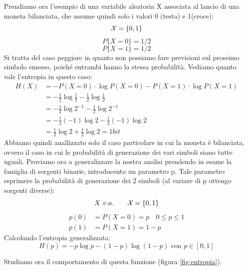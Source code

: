 Prendiamo ora l'esempio di una variabile aleatoria X associata al lancio di una moneta bilanciata, che assume quindi solo i valori 0 (testa) e 1(croce):
\[\mathcal{X} = \{0,1\}\]
\[P\{X = 0\} = 1/2\]
\[P\{X = 1\} = 1/2\]
Si tratta del caso peggiore in quanto non possiamo fare previsioni sul prossimo simbolo emesso, poiché entrambi hanno la stessa probabilità. Vediamo quanto vale l'entropia in questo caso:
\[
\begin{split} 
H(X) &= - P(X = 0) \cdot \log P(X = 0) - P(X = 1) \cdot \log P(X = 1)\\ 
&= -\frac{1}{2} \log{\frac{1}{2}} -\frac{1}{2} \log{\frac{1}{2}}\\ 
&= - \frac{1}{2} \log{2^{-1}} - \frac{1}{2} \log{2^{-1}}\\
&= - \frac{1}{2} (-1) \log{2} - \frac{1}{2} (-1) \log{2}\\
&= \frac{1}{2} \log{2} + \frac{1}{2} \log{2} = 1 bit
\end{split} 
\]
Abbiamo quindi anallizzato solo il caso particolare in cui la moneta è bilanciata, ovvero il caso in cui le probabilità di generazione dei vari simboli siano tutte uguali. Proviamo ora a generalizzare la nostra analisi prendendo in esame la famiglia di sorgenti binarie, introducento un parametro p. Tale parametro esprimere la probabilità di generazione dei 2 simboli (al variare di p ottengo sorgenti diverse):
\[X \ v.a. \qquad \X = \{0,1\}\]
\begin{align*}
p(0) &= P(X = 0) = p \quad 0 \leq p \leq 1 \\
p(1) &= P(X = 1) = 1-p
\end{align*}
Calcolando l'entropia generalizzata:
\[H(p) = - p \log{p} -(1-p) \log (1-p) \mbox{ con } p \in [0,1]\]

\noindent
Studiamo ora il comportamento di questa funzione (figura \ref{fig:entropia}).

